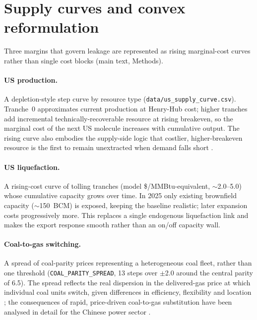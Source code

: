 \documentclass[11pt]{article}
\begin{document}
\section{Supply curves and convex reformulation}\label{si:curves}

Three margins that govern leakage are represented as rising marginal-cost
curves rather than single cost blocks (main text, Methods).

\paragraph{US production.} A depletion-style step curve by resource type
(\texttt{data/us\_supply\_curve.csv}). Tranche~0 approximates current
production at Henry-Hub cost; higher tranches add incremental
technically-recoverable resource at rising breakeven, so the marginal cost of
the next US molecule increases with cumulative output. The rising curve also
embodies the supply-side logic that costlier, higher-breakeven resource is the
first to remain unextracted when demand falls short
\citep{Welsby2021, GreenDenniss2018}.

\paragraph{US liquefaction.} A rising-cost curve of tolling tranches
(model \$/MMBtu-equivalent, $\sim$2.0--5.0) whose cumulative capacity grows
over time. In 2025 only existing brownfield capacity ($\sim$150~BCM) is
exposed, keeping the baseline realistic; later expansion costs progressively
more. This replaces a single endogenous liquefaction link and makes the
export response smooth rather than an on/off capacity wall.

\paragraph{Coal-to-gas switching.} A spread of coal-parity prices
representing a heterogeneous coal fleet, rather than one threshold
(\texttt{COAL\_PARITY\_SPREAD}, 13 steps over $\pm$2.0 around the central
parity of 6.5). The spread reflects the real dispersion in the
delivered-gas price at which individual coal units switch, given differences
in efficiency, flexibility and location \citep{GonzalezSalazar2018}; the
consequences of rapid, price-driven coal-to-gas substitution have been analysed
in detail for the Chinese power sector \citep{Qin2017}.
\end{document}
